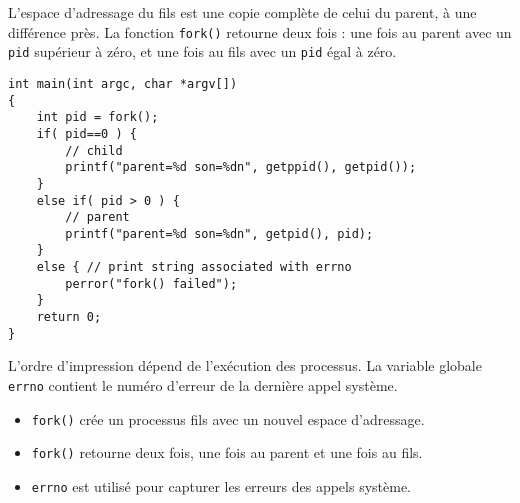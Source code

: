 \documentclass[12pt]{article}
\begin{document}
L'espace d'adressage du fils est une copie complète de celui du parent, à une différence près. La fonction \texttt{fork()} retourne deux fois : une fois au parent avec un \texttt{pid} supérieur à zéro, et une fois au fils avec un \texttt{pid} égal à zéro.

\begin{lstlisting}
int main(int argc, char *argv[])
{
    int pid = fork();
    if( pid==0 ) {
        // child
        printf("parent=%d son=%dn", getppid(), getpid());
    }
    else if( pid > 0 ) {
        // parent
        printf("parent=%d son=%dn", getpid(), pid);
    }
    else { // print string associated with errno
        perror("fork() failed");
    }
    return 0;
}
\end{lstlisting}

L'ordre d'impression dépend de l'exécution des processus. La variable globale \texttt{errno} contient le numéro d'erreur de la dernière appel système.

\begin{tcolorbox}[title={Fiche Récapitulative}]
\begin{itemize}
    \item \texttt{fork()} crée un processus fils avec un nouvel espace d'adressage.
    \item \texttt{fork()} retourne deux fois, une fois au parent et une fois au fils.
    \item \texttt{errno} est utilisé pour capturer les erreurs des appels système.
\end{itemize}
\end{tcolorbox}
\end{document}
